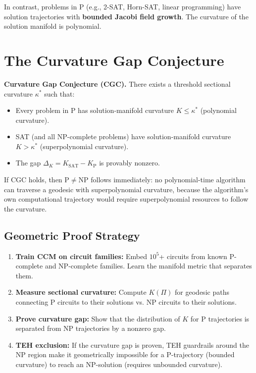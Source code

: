\documentclass{article}
\begin{document}
In contrast, problems in P (e.g., 2-SAT, Horn-SAT, linear programming)
have solution trajectories with \textbf{bounded Jacobi field growth}.
The curvature of the solution manifold is polynomial.

\section{The Curvature Gap Conjecture}
\label{sec:curvature-gap}

\textbf{Curvature Gap Conjecture (CGC).}  There exists a threshold
sectional curvature $\kappa^*$ such that:

\begin{itemize}
  \item Every problem in P has solution-manifold curvature $K \leq \kappa^*$
    (polynomial curvature).
  \item SAT (and all NP-complete problems) have solution-manifold curvature
    $K > \kappa^*$ (superpolynomial curvature).
  \item The gap $\Delta_K = K_{\text{SAT}} - K_{\text{P}}$ is provably
    nonzero.
\end{itemize}

If CGC holds, then $\mathrm{P} \neq \mathrm{NP}$ follows immediately: no
polynomial-time algorithm can traverse a geodesic with superpolynomial
curvature, because the algorithm's own computational trajectory would
require superpolynomial resources to follow the curvature.

\subsection{Geometric Proof Strategy}

\begin{enumerate}
  \item \textbf{Train CCM on circuit families:} Embed $10^5$+ circuits
    from known P-complete and NP-complete families.  Learn the manifold
    metric that separates them.
  \item \textbf{Measure sectional curvature:} Compute $K(\Pi)$ for
    geodesic paths connecting P circuits to their solutions vs. NP circuits
    to their solutions.
  \item \textbf{Prove curvature gap:} Show that the distribution of $K$
    for P trajectories is separated from NP trajectories by a nonzero gap.
  \item \textbf{TEH exclusion:} If the curvature gap is proven, TEH
    guardrails around the NP region make it geometrically impossible for
    a P-trajectory (bounded curvature) to reach an NP-solution (requires
    unbounded curvature).
\end{enumerate}
\end{document}
